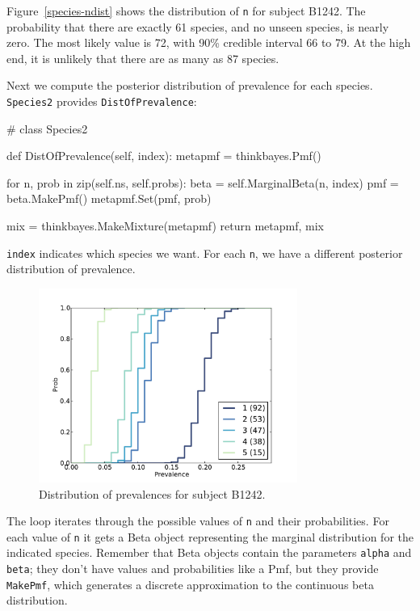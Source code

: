 \documentclass[12pt]{book}
\theoremstyle{exercise}
\begin{document}
Figure~\ref{species-ndist} shows the distribution of {\tt n} for
subject B1242.  The probability that there are exactly 61 species, and
no unseen species, is nearly zero.  The most likely value is 72, with
90\% credible interval 66 to 79.  At the high end, it is unlikely that
there are as many as 87 species.

Next we compute the posterior distribution of prevalence for
each species.  {\tt Species2} provides {\tt DistOfPrevalence}:

\begin{code}
# class Species2

    def DistOfPrevalence(self, index):
        metapmf = thinkbayes.Pmf()

        for n, prob in zip(self.ns, self.probs):
            beta = self.MarginalBeta(n, index)
            pmf = beta.MakePmf()
            metapmf.Set(pmf, prob)

        mix = thinkbayes.MakeMixture(metapmf)
        return metapmf, mix
\end{code}

{\tt index} indicates which species we want.  For each
{\tt n}, we have a different posterior distribution
of prevalence.

\begin{figure}
\centerline{\includegraphics[height=2.5in]{figs/species-prev-B1242.pdf}}
\caption{Distribution of prevalences for subject B1242.}
\label{species-prev}
\end{figure}

The loop iterates through the possible values of {\tt n}
and their probabilities.  For each value of {\tt n} it gets
a Beta object representing the marginal distribution for the
indicated species.  Remember that Beta objects contain the
parameters {\tt alpha} and {\tt beta}; they don't have
values and probabilities like a Pmf, but they provide {\tt MakePmf},
which generates a discrete approximation to the continuous
beta distribution.
\end{document}
